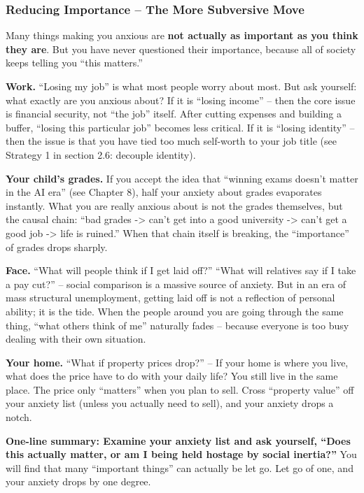 \subsubsection{Reducing Importance -- The More Subversive
Move}\label{reducing-importance-the-more-subversive-move}

Many things making you anxious are \textbf{not actually as important as
you think they are}. But you have never questioned their importance,
because all of society keeps telling you ``this matters.''

\textbf{Work.} ``Losing my job'' is what most people worry about most.
But ask yourself: what exactly are you anxious about? If it is ``losing
income'' -- then the core issue is financial security, not ``the job''
itself. After cutting expenses and building a buffer, ``losing this
particular job'' becomes less critical. If it is ``losing identity'' --
then the issue is that you have tied too much self-worth to your job
title (see Strategy 1 in section 2.6: decouple identity).

\textbf{Your child's grades.} If you accept the idea that ``winning
exams doesn't matter in the AI era'' (see Chapter 8), half your anxiety
about grades evaporates instantly. What you are really anxious about is
not the grades themselves, but the causal chain: ``bad grades
-\textgreater{} can't get into a good university -\textgreater{} can't
get a good job -\textgreater{} life is ruined.'' When that chain itself
is breaking, the ``importance'' of grades drops sharply.

\textbf{Face.} ``What will people think if I get laid off?'' ``What will
relatives say if I take a pay cut?'' -- social comparison is a massive
source of anxiety. But in an era of mass structural unemployment,
getting laid off is not a reflection of personal ability; it is the
tide. When the people around you are going through the same thing,
``what others think of me'' naturally fades -- because everyone is too
busy dealing with their own situation.

\textbf{Your home.} ``What if property prices drop?'' -- If your home is
where you live, what does the price have to do with your daily life? You
still live in the same place. The price only ``matters'' when you plan
to sell. Cross ``property value'' off your anxiety list (unless you
actually need to sell), and your anxiety drops a notch.

\textbf{One-line summary: Examine your anxiety list and ask yourself,
``Does this actually matter, or am I being held hostage by social
inertia?''} You will find that many ``important things'' can actually be
let go. Let go of one, and your anxiety drops by one degree.

